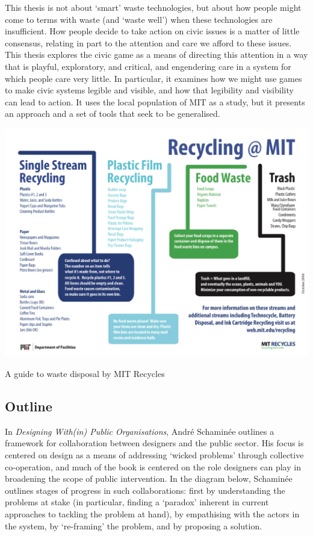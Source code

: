 \documentclass[nofonts,nols,justified,nobib]{tufte-book}
\begin{document}
This thesis is not about `smart' waste technologies, but about how people might come to terms with waste (and `waste well') when these technologies are insufficient. How people decide to take action on civic issues is a matter of little consensus, relating in part to the attention and care we afford to these issues. This thesis explores the civic game as a means of directing this attention in a way that is playful, exploratory, and critical, and engendering care in a system for which people care very little. In particular, it examines how we might use games to make civic systems legible and visible, and how that legibility and visibility can lead to action. It uses the local population of MIT as a study, but it presents an approach and a set of tools that seek to be generalised.


\begin{marginfigure}
\includegraphics[width=\textwidth]{img/1/flowchart.png}
\caption{A guide to waste disposal by MIT Recycles}
\end{marginfigure}

\subsection*{Outline}

In \emph{Designing With(in) Public Organisations}, Andr\'e Schamin\'ee outlines a framework for collaboration between designers and the public sector. His focus is centered on design as a means of addressing `wicked problems'\cite{rittel_dilemmas_1973} through collective co-operation, and much of the book is centered on the role designers can play in broadening the scope of public intervention. In the diagram below, Schamin\'ee outlines stages of progress in such collaborations: first by understanding the problems at stake (in particular, finding a `paradox' inherent in current approaches to tackling the problem at hand), by empathising with the actors in the system, by `re-framing' the problem, and by proposing a solution. \cite{schaminee_designing_2018}
\end{document}

